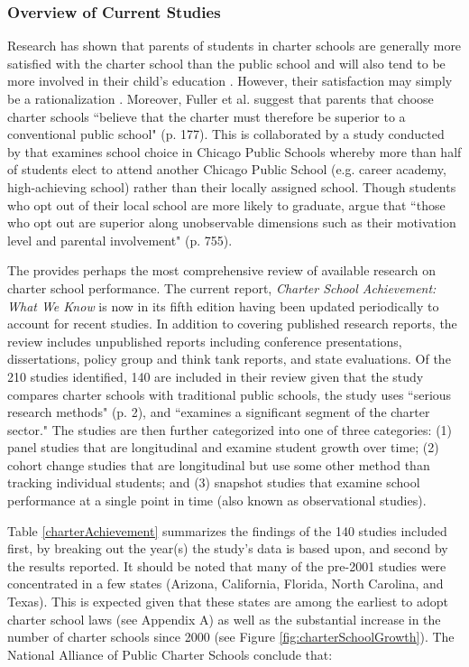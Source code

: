 \documentclass[letterpaper,12p,twoside]{article} %
\begin{document}
\subsubsection{Overview of Current Studies}
Research has shown that parents of students in charter schools are generally more satisfied with the charter school than the public school and will also tend to be more involved in their child's education \cite{TeskeSchneider2001,VanourekMannoFinnBierlein1998}. However, their satisfaction may simply be a rationalization \cite{HubbardKulkarni2009}. Moreover, Fuller et al. \cite<1996, as cited in>{HubbardKulkarni2009} suggest that parents that choose charter schools ``believe that the charter must therefore be superior to a conventional public school" (p. 177). This is collaborated by a study conducted by  that examines school choice in Chicago Public Schools whereby more than half of students elect to attend another Chicago Public School (e.g. career academy, high-achieving school) rather than their locally assigned school. Though students who opt out of their local school are more likely to graduate,  argue that ``those who opt out are superior along unobservable dimensions such as their motivation level and parental involvement" (p. 755). 

The  provides perhaps the most comprehensive review of available research on charter school performance. The current report, \textit{Charter School Achievement: What We Know} is now in its fifth edition having been updated periodically to account for recent studies. In addition to covering published research reports, the review includes unpublished reports including conference presentations, dissertations, policy group and think tank reports, and state evaluations. Of the 210 studies identified, 140 are included in their review given that the study compares charter schools with traditional public schools, the study uses ``serious research methods" (p. 2), and ``examines a significant segment of the charter sector." The studies are then further categorized into one of three categories: (1) panel studies that are longitudinal and examine student growth over time; (2) cohort change studies that are longitudinal but use some other method than tracking individual students; and (3) snapshot studies that examine school performance at a single point in time (also known as observational studies).

Table \ref{charterAchievement} summarizes the findings of the 140 studies included first, by breaking out the year(s) the study's data is based upon, and second by the results reported. It should be noted that many of the pre-2001 studies were concentrated in a few states (Arizona, California, Florida, North Carolina, and Texas). This is expected given that these states are among the earliest to adopt charter school laws (see Appendix A) as well as the substantial increase in the number of charter schools since 2000 (see Figure \ref{fig:charterSchoolGrowth}). The National Alliance of Public Charter Schools conclude that:
\end{document}
